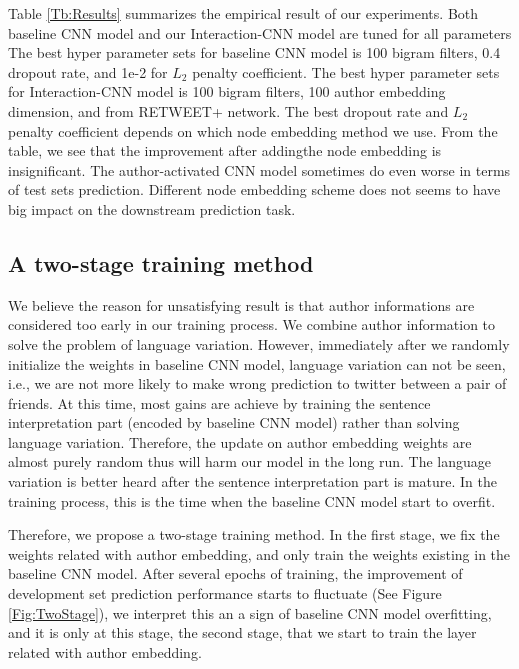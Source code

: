 Table \ref{Tb:Results} summarizes the empirical result of our experiments. Both baseline CNN model 
and our Interaction-CNN model are tuned for all parameters The best hyper parameter sets for baseline 
CNN model is 100 bigram filters, 0.4 dropout rate, and 1e-2 for $L_2$ penalty coefficient. The best 
hyper parameter sets for Interaction-CNN model is 100 bigram filters, 100 author embedding dimension, 
and from RETWEET+ network. The best dropout rate and $L_2$ penalty coefficient depends on which 
node embedding method we use. From the table, we see that the improvement after addingthe node 
embedding is insignificant. The author-activated CNN model sometimes do even worse in terms of test 
sets prediction. Different node embedding scheme does not seems to have big impact on the downstream 
prediction task.





\subsection{A two-stage training method}
We believe the reason for unsatisfying result is that author informations are considered too early 
in our training process. We combine author information to solve the problem of language variation. 
However, immediately after we randomly initialize the weights in baseline CNN model, language variation 
can not be seen, i.e., we are not more likely to make wrong prediction to twitter between a pair of friends. 
At this time, most gains are achieve by training the sentence interpretation part (encoded by baseline CNN model)
rather than solving language variation. Therefore, the update on author embedding weights are almost purely 
random thus will harm our model in the long run. The language variation is better heard after the sentence 
interpretation part is mature. In the training process, this is the time when the baseline CNN model start to overfit. 

Therefore, we propose a two-stage training method.
In the first stage, we fix the weights related with author embedding, and only train the weights existing in the
baseline CNN model. After several epochs of training, the improvement of development set prediction 
performance starts to fluctuate  (See Figure \ref{Fig:TwoStage}), we interpret this an a sign of baseline 
CNN model overfitting, and it is only at this stage, the second stage, that we start to train the layer related with
author embedding. 

